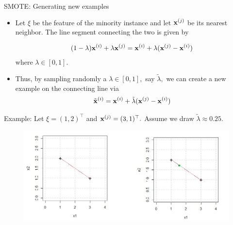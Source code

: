 \documentclass[11pt,compress,t,notes=noshow, xcolor=table]{beamer}
\begin{document}
	\begin{frame}{SMOTE: Generating new examples}
		\footnotesize
		
			\begin{itemize}
				\item Let $\xi$ be the feature of the minority instance and let $\mathbf{x}^{(j)}$ be its nearest neighbor. The line segment connecting the two is given by
				
				$$		(1-\lambda) \mathbf{x}^{(i)} + \lambda\mathbf{x}^{(j)} = \mathbf{x}^{(i)} + \lambda(\mathbf{x}^{(j)} - \mathbf{x}^{(i)})	$$
%				
				where $\lambda \in [0,1].$
				\item Thus, by sampling randomly a $\lambda \in [0,1],$ say $\tilde{\lambda},$ we can create a new example on the connecting line via
%				
				$$   \tilde{\mathbf{x}}^{(i)} =  \mathbf{x}^{(i)} + \tilde{\lambda}(\mathbf{x}^{(j)} - \mathbf{x}^{(i)})	 $$
			\end{itemize}		
				
				Example: Let $\xi = (1,2)^\top$ and $\mathbf{x}^{(j)} = (3,1)^\top.$ Assume we draw $\tilde{\lambda} \approx 0.25.$
			\begin{figure}
				\centering
				\includegraphics[width=0.8\linewidth]{figure_man/coordinate_system}
			\end{figure}
		
	\end{frame}
\end{document}
